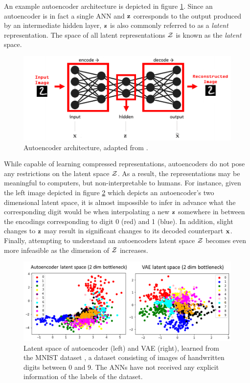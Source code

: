 An example autoencoder architecture is depicted in figure \ref{fig:autoencoder}. Since an autoencoder is in fact a single ANN and $\mathbf{z}$ corresponds to the output produced by an intermediate hidden layer, $\mathbf{z}$ is also commonly referred to as a \textit{latent} representation. The space of all latent representations $\mathcal{Z}$ is known as the \textit{latent} space.
	\begin{figure}
		\centering
		\includegraphics[width=0.7\linewidth]{autoencoder}
		\caption{Autoencoder architecture, adapted from \citep{karagiannakosHowGenerateImages2018}.}
		\label{fig:autoencoder}
	\end{figure}
While capable of learning compressed representations, autoencoders do not pose any restrictions on the latent space $\mathcal{Z}$. As a result, the representations may be meaningful to computers, but non-interpretable to humans. For instance, given the left image depicted in figure \ref{fig:latent_space_2d} which depicts an autoencoder's two dimensional latent space, it is almost impossible to infer in advance what the corresponding digit would be when interpolating a new $\mathbf{z}$ somewhere in between the encodings corresponding to digit 0 (red) and 1 (blue). In addition, slight changes to $\mathbf{z}$ may result in significant changes to its decoded counterpart $\mathbf{x}$. Finally, attempting to understand an autoencoders latent space $\mathcal{Z}$ becomes even more infeasible as the dimension of $\mathcal{Z}$ increases.

\begin{figure}
	\centering
	\includegraphics[width=0.7\linewidth]{screenshot021}
	\caption{ Latent space of autoencoder (left) and VAE (right), learned from the MNIST dataset \citep{lecunGradientbasedLearningApplied1998}, a dataset consisting of images of handwritten digits between 0 and 9. The ANNs have not received any explicit information of the labels of the dataset. 
}
	\label{fig:latent_space_2d}
\end{figure}



